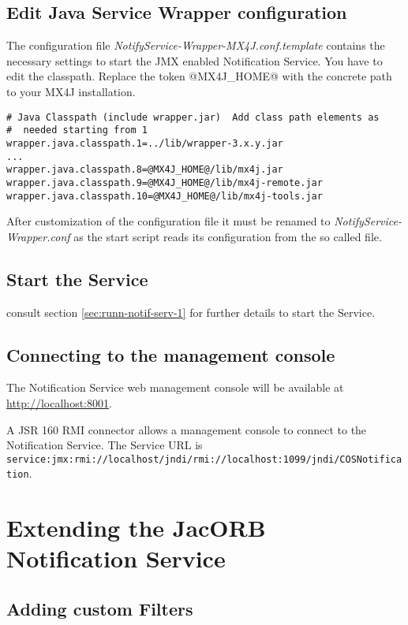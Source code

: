 \subsection{Edit Java Service Wrapper configuration}

The configuration file \emph{NotifyService-Wrapper-MX4J.conf.template} contains the necessary settings to start the
JMX enabled Notification Service. You have to edit the classpath. Replace the token @MX4J\_HOME@ with the concrete path to your MX4J installation.

\begin{verbatim}
# Java Classpath (include wrapper.jar)  Add class path elements as
#  needed starting from 1
wrapper.java.classpath.1=../lib/wrapper-3.x.y.jar
...
wrapper.java.classpath.8=@MX4J_HOME@/lib/mx4j.jar
wrapper.java.classpath.9=@MX4J_HOME@/lib/mx4j-remote.jar
wrapper.java.classpath.10=@MX4J_HOME@/lib/mx4j-tools.jar
\end{verbatim}

After customization of the configuration file it must be renamed to \emph{NotifyService-Wrapper.conf} as the start script reads its configuration from the so called file.

\subsection{Start the Service}
consult section \ref{sec:runn-notif-serv-1} for further details to start the Service.

\subsection{Connecting to the management console}

The Notification Service web management console will be available at
\href{http://localhost:8001}{http://localhost:8001}.

A JSR 160 RMI connector allows a management console to connect to the Notification Service. The Service URL is \texttt{service:jmx:rmi://localhost/jndi/rmi://localhost:1099/jndi/COSNotification}.

\section{Extending the JacORB Notification Service}
\subsection{Adding custom Filters}

